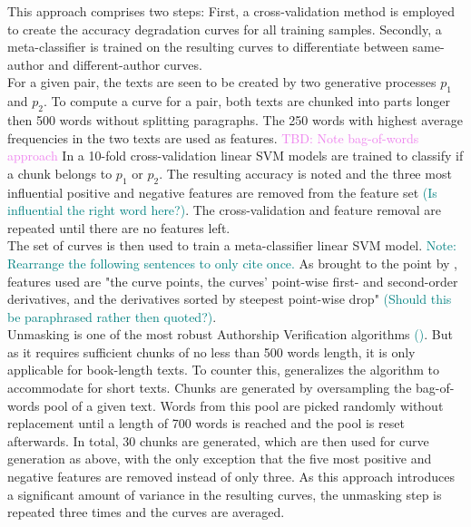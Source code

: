 This approach comprises two steps: First, a cross-validation method is employed to create the accuracy degradation curves for all training samples.
Secondly, a meta-classifier is trained on the resulting curves to differentiate between same-author and different-author curves.\\
For a given pair, the texts are seen to be created by two generative processes $p_1$ and $p_2$.
To compute a curve for a pair, both texts are chunked into parts longer then 500 words without splitting paragraphs.
The 250 words with highest average frequencies in the two texts are used as features.
\textcolor{violet}{TBD: Note bag-of-words approach}
In a 10-fold cross-validation linear SVM models are trained to classify if a chunk belongs to $p_1$ or $p_2$.
The resulting accuracy is noted and the three most influential positive and negative features are removed from the feature set \textcolor{teal}{(Is influential the right word here?)}.
The cross-validation and feature removal are repeated until there are no features left.\\
The set of curves is then used to train a meta-classifier linear SVM model.
\textcolor{teal}{Note: Rearrange the following sentences to only cite \cite{bevendorff2019unmaskingShortTexts} once.}
As brought to the point by \cite{bevendorff2019unmaskingShortTexts}, features used are "the curve points, the curves' point-wise first- and second-order derivatives, and the derivatives sorted by steepest point-wise drop" \textcolor{teal}{(Should this be paraphrased rather then quoted?)}.\\
Unmasking is one of the most robust Authorship Verification algorithms \textcolor{teal}{(\cite{bevendorff2019unmaskingShortTexts})}.
But as it requires sufficient chunks of no less than 500 words length, it is only applicable for book-length texts.
To counter this, \cite{bevendorff2019unmaskingShortTexts} generalizes the algorithm to accommodate for short texts.
Chunks are generated by oversampling the bag-of-words pool of a given text.
Words from this pool are picked randomly without replacement until a length of 700 words is reached and the pool is reset afterwards.
In total, 30 chunks are generated, which are then used for curve generation as above, with the only exception that the five most positive and negative features are removed instead of only three.
As this approach introduces a significant amount of variance in the resulting curves, the unmasking step is repeated three times and the curves are averaged.
